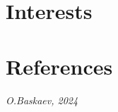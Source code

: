 \documentclass[11pt,a4paper,sans]{moderncv}
\begin{document}
\section{Interests}


\section{References}
\begin{cvcolumns}

\end{cvcolumns}

\vfill
\emptysection{}\closesection
\vfill
\begin{center}
\textit{\small O.Baskaev, 2024}
\end{center}


\clearpage
\end{document}
